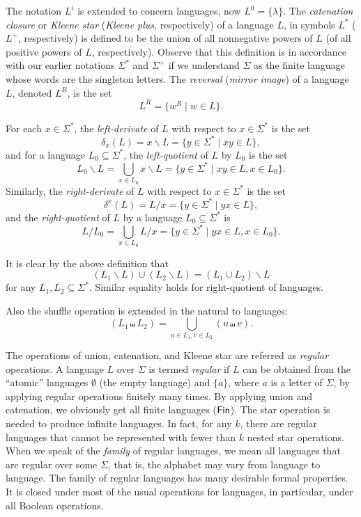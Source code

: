 The notation $L^i$ is extended to concern languages, now $L^0 = \{\lambda\}$. The \emph{catenation closure} or  \emph{Kleene star} (\emph{Kleene plus}, respectively) of a language $L$, in symbols $L^*$ ($L^+$, respectively) is defined to be the union of all nonnegative powers of $L$ (of all positive powers of $L$, respectively). Observe that this definition is in accordance with our earlier notations $\Sigma^*$ and $\Sigma^+$ if we understand $\Sigma$ as the finite language whose words are the singleton letters. The \emph{reversal} (\emph{mirror image}) of a language $L$, denoted $L^R$, is the set $$L^R = \{w^R \mid w \in L\}.$$

For each $x \in \Sigma^*$, the \emph{left-derivate} of $L$ with respect to $x \in \Sigma^*$ is the set $$\delta_x(L) = x \backslash L = \{y \in \Sigma^* \mid xy \in L\},$$ and for a language $L_0 \subseteq \Sigma^*$, the \emph{left-quotient} of $L$ by $L_0$ is the set $$L_0 \backslash L = \bigcup_{x \in L_0} x \backslash L = \{y \in \Sigma^* \mid xy \in L, x \in L_0\}.$$ Similarly, the \emph{right-derivate} of $L$ with respect to $x \in \Sigma^*$ is the set $$\delta^x(L) = L / x = \{y \in \Sigma^* \mid yx \in L\},$$ and the \emph{right-quotient} of $L$ by a language $L_0 \subseteq \Sigma^*$ is $$L / L_0 = \bigcup_{x \in L_0} L / x = \{y \in \Sigma^* \mid yx \in L, x \in L_0\}.$$

It is clear by the above definition that $$(L_1 \backslash L) \cup (L_2 \backslash L) = (L_1 \cup L_2) \backslash L$$ for any $L_1, L_2 \subseteq \Sigma^*$. Similar equality holds for right-quotient of languages.

Also the shuffle operation is extended in the natural to languages:
$$(L_1 \shuffle L_2) = \bigcup_{u \in L_1, v \in L_2}(u \shuffle v).$$

The operations of union, catenation, and Kleene star are referred as \emph{regular} operations. A language $L$ over $\Sigma$ is termed \emph{regular} if $L$ can be obtained from the ``atomic'' languages $\emptyset$ (the  empty language) and $\{a\}$, where $a$ is a letter of $\Sigma$, by applying regular operations finitely many times. By applying union and catenation, we obviously get all finite languages \index{$\Fin$}($\Fin$). The star operation is needed to produce infinite languages. In fact, for any $k$, there are regular languages that cannot be represented with fewer than $k$ nested star operations. When we speak of the \emph{family} of regular languages, we mean all languages that are regular over some $\Sigma$, that is, the alphabet may vary from language to language. The family of regular languages has many desirable formal properties. It is closed under most of the usual operations for languages, in particular, under all Boolean operations.

